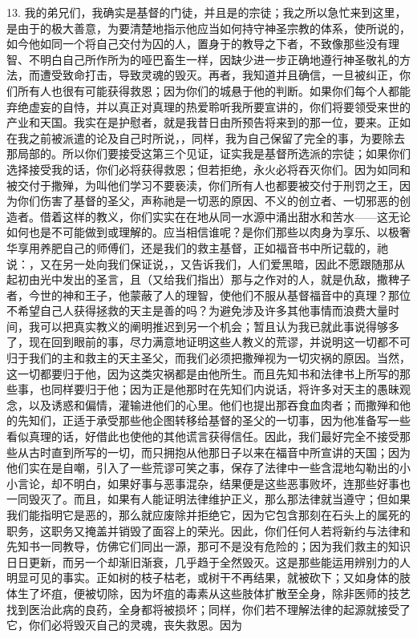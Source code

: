 13. 我的弟兄们，我确实是基督的门徒，并且是的宗徒；我之所以急忙来到这里，是由于的极大善意，为要清楚地指示他应当如何持守神圣宗教的体系，使所说的，如今他如同一个将自己交付为囚的人，置身于的教导之下者，不致像那些没有理智、不明白自己所作所为的哑巴畜生一样，因缺少进一步正确地遵行神圣敬礼的方法，而遭受致命打击，导致灵魂的毁灭。再者，我知道并且确信，一旦被纠正，你们所有人也很有可能获得救恩；因为你们的城悬于他的判断。如果你们每个人都能弃绝虚妄的自恃，并以真正对真理的热爱聆听我所要宣讲的，你们将要领受来世的产业和天国。我实在是护慰者，就是我昔日由所预告将来到的那一位，要来。正如在我之前被派遣的论及自己时所说，，同样，我为自己保留了完全的事，为要除去那局部的。所以你们要接受这第三个见证，证实我是基督所选派的宗徒；如果你们选择接受我的话，你们必将获得救恩；但若拒绝，永火必将吞灭你们。因为如同和被交付于撒殚，为叫他们学习不要亵渎，你们所有人也都要被交付于刑罚之王，因为你们伤害了基督的圣父，声称祂是一切恶的原因、不义的创立者、一切邪恶的创造者。借着这样的教义，你们实实在在地从同一水源中涌出甜水和苦水——这无论如何也是不可能做到或理解的。应当相信谁呢？是你们那些以肉身为享乐、以极奢华享用养肥自己的师傅们，还是我们的救主基督，正如福音书中所记载的，祂说：，又在另一处向我们保证说，，又告诉我们，人们爱黑暗，因此不愿跟随那从起初由光中发出的圣言，且（又给我们指出）那与之作对的人，就是仇敌，撒稗子者，今世的神和王子，他蒙蔽了人的理智，使他们不服从基督福音中的真理？那位不希望自己人获得拯救的天主是善的吗？为避免涉及许多其他事情而浪费大量时间，我可以把真实教义的阐明推迟到另一个机会；暂且认为我已就此事说得够多了，现在回到眼前的事，尽力满意地证明这些人教义的荒谬，并说明这一切都不可归于我们的主和救主的天主圣父，而我们必须把撒殚视为一切灾祸的原因。当然，这一切都要归于他，因为这类灾祸都是由他所生。而且先知书和法律书上所写的那些事，也同样要归于他；因为正是他那时在先知们内说话，将许多对天主的愚昧观念，以及诱惑和偏情，灌输进他们的心里。他们也提出那吞食血肉者；而撒殚和他的先知们，正适于承受那些他企图转移给基督的圣父的一切事，因为他准备写一些看似真理的话，好借此也使他的其他谎言获得信任。因此，我们最好完全不接受那些从古时直到所写的一切，而只拥抱从他那日子以来在福音中所宣讲的天国；因为他们实在是自嘲，引入了一些荒谬可笑之事，保存了法律中一些含混地勾勒出的小小言论，却不明白，如果好事与恶事混杂，结果便是这些恶事败坏，连那些好事也一同毁灭了。而且，如果有人能证明法律维护正义，那么那法律就当遵守；但如果我们能指明它是恶的，那么就应废除并拒绝它，因为它包含那刻在石头上的属死的职务，这职务又掩盖并销毁了面容上的荣光。因此，你们任何人若将新约与法律和先知书一同教导，仿佛它们同出一源，那可不是没有危险的；因为我们救主的知识日日更新，而另一个却渐旧渐衰，几乎趋于全然毁灭。这是那些能运用辨别力的人明显可见的事实。正如树的枝子枯老，或树干不再结果，就被砍下；又如身体的肢体生了坏疽，便被切除，因为坏疽的毒素从这些肢体扩散至全身，除非医师的技艺找到医治此病的良药，全身都将被损坏；同样，你们若不理解法律的起源就接受了它，你们必将毁灭自己的灵魂，丧失救恩。因为